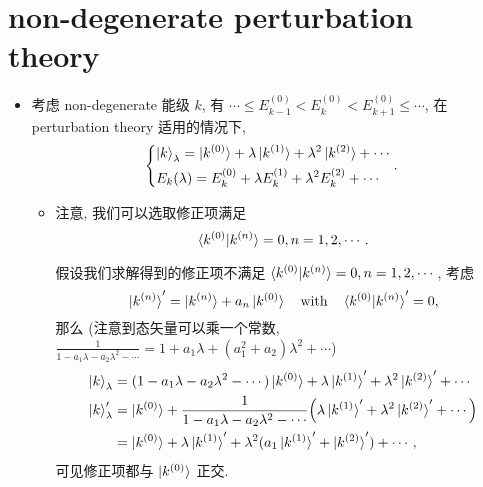 \section{non-degenerate perturbation theory}
\begin{itemize}
	\item 考虑 non-degenerate 能级 $k$, 有 $\cdots \leq E_{k - 1}^{(0)} < E_k^{(0)} < E_{k + 1}^{(0)} \leq \cdots$, 在 perturbation theory 适用的情况下,
	\begin{equation} \label{C.1.1}
		\begin{dcases}
			\ket{k}_\lambda = \ket{k^{(0)}} + \lambda \ket{k^{(1)}} + \lambda^2 \ket{k^{(2)}} + \cdots \\
			E_k(\lambda) = E_k^{(0)} + \lambda E_k^{(1)} + \lambda^2 E_k^{(2)} + \cdots
		\end{dcases}.
	\end{equation}
	\begin{itemize}
			\item 注意, 我们可以选取修正项满足
			\begin{equation} \label{C.1.2}
				\braket{k^{(0)} | k^{(n)}} = 0, n = 1, 2, \cdots.
			\end{equation}
			
			\begin{tcolorbox}[title=proof:]
				假设我们求解得到的修正项不满足 $\braket{k^{(0)} | k^{(n)}} = 0, n = 1, 2, \cdots$, 考虑
				\begin{equation}
					\ket{k^{(n)}}' = \ket{k^{(n)}} + a_n \ket{k^{(0)}} \quad \text{with} \quad \braket{k^{(0)} | k^{(n)}}' = 0,
				\end{equation}
				那么 (注意到态矢量可以乘一个常数, $\frac{1}{1 - a_1 \lambda - a_2 \lambda^2 - \cdots} = 1 + a_1 \lambda + (a_1^2 + a_2) \lambda^2 + \cdots$)
				\begin{align}
					\ket{k}_\lambda &= (1 - a_1 \lambda - a_2 \lambda^2 - \cdots) \ket{k^{(0)}} + \lambda \ket{k^{(1)}}' + \lambda^2 \ket{k^{(2)}}' + \cdots \notag \\
					\ket{k}'_\lambda &= \ket{k^{(0)}} + \frac{1}{1 - a_1 \lambda - a_2 \lambda^2 - \cdots} \Big( \lambda \ket{k^{(1)}}' + \lambda^2 \ket{k^{(2)}}' + \cdots \Big) \notag \\
					&= \ket{k^{(0)}} + \lambda \ket{k^{(1)}}' + \lambda^2 (a_1 \ket{k^{(1)}}' + \ket{k^{(2)}}') + \cdots,
				\end{align}
				可见修正项都与 $\ket{k^{(0)}}$ 正交.
			\end{tcolorbox}
			

\end{itemize}
\end{itemize}
